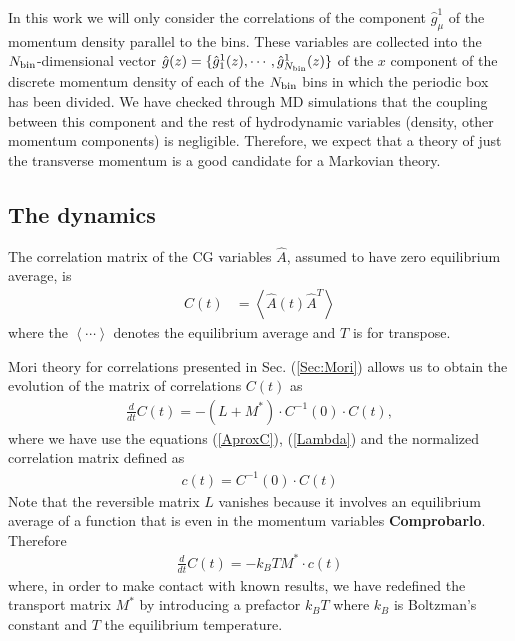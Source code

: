 \documentclass[b5paper,openright,11pt]{book}
\newcommand{\esc}{\!\cdot\!}
\newcommand{\Note}[1]{{\bf \color{red}#1}}    %
\newcommand{\llangle}{\left\langle}
\newcommand{\rrangle}{\right\rangle}
\begin{document}
In this work we  will only  consider the correlations  of the
component  $\hat{g}^1_\mu$ of  the  momentum density  parallel to  the
bins. These variables are collected into the $N_{\rm bin}$-dimensional
vector           $\hat{g}(z)=\{\hat{g}^1_1(z),\cdots,\hat{g}^1_{N_{\rm
    bin}}(z)\}$ of the $x$ component  of the discrete momentum density
of each of the ${N_{\rm bin}}$ bins in which the periodic box has been
divided.  We  have checked  through MD  simulations that  the coupling
between  this  component  and   the  rest  of  hydrodynamic  variables
(density,  other momentum  components) is  negligible.  Therefore,  we
expect  that a  theory  of  just the  transverse  momentum  is a  good
candidate for  a Markovian theory.  

\subsection{The dynamics}
\label{Sec:Trans}
The correlation matrix of the  CG variables $\hat{A}$, assumed to have zero
equilibrium average, is 
\begin{align}
  C(t)&=\llangle \hat{A}(t)\hat{A}^T\rrangle
\end{align}
where the $\llangle\cdots\rrangle$ denotes the equilibrium average and
$T$ is for transpose. 

Mori theory for correlations presented in Sec. (\ref{Sec:Mori}) allows us to obtain the evolution of the matrix of correlations $C(t)$ as
\begin{align}
    \frac{d}{dt}C(t) = -(L+M^*)\cdot C^{-1}(0)\cdot C(t),
\end{align}
where we have use the equations (\ref{AproxC}), (\ref{Lambda}) and the normalized correlation matrix defined as
\begin{align}
  c(t)=C^{-1}(0)\esc C(t)
\end{align}
Note that the reversible matrix $L$ vanishes because it involves an equilibrium average of a function that is even in the momentum variables \Note{Comprobarlo}. Therefore
\begin{align}
    \frac{d}{dt}C(t) = -k_BTM^*\cdot c(t)
    \label{AproxCg}
\end{align}
where, in order to make contact  with known results, we have redefined
the transport  matrix $M^*$  by introducing  a prefactor  $k_BT$ where
$k_B$ is Boltzman's constant and $T$ the equilibrium temperature. 
\end{document}

